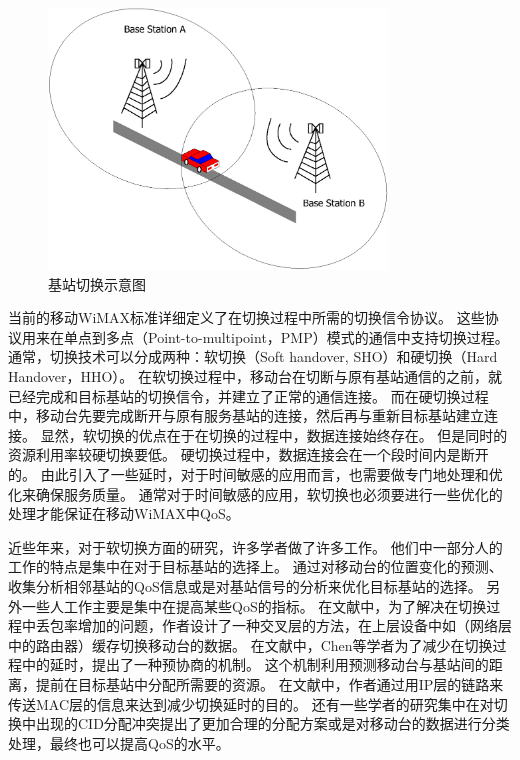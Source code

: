 \begin{figure}[t]
\begin{centering}
\includegraphics[width=9cm]{../figures/iccs_handover_bs}
\caption{基站切换示意图}
\label{fig:chap_iccs_handover_bs}
\end{centering}
\end{figure}

当前的移动WiMAX标准详细定义了在切换过程中所需的切换信令协议。
这些协议用来在单点到多点（Point-to-multipoint，PMP）模式的通信中支持切换过程。
通常，切换技术可以分成两种：软切换（Soft handover, SHO）和硬切换（Hard Handover，HHO）。
在软切换过程中，移动台在切断与原有基站通信的之前，就已经完成和目标基站的切换信令，并建立了正常的通信连接。
而在硬切换过程中，移动台先要完成断开与原有服务基站的连接，然后再与重新目标基站建立连接。
显然，软切换的优点在于在切换的过程中，数据连接始终存在。
但是同时的资源利用率较硬切换要低。
硬切换过程中，数据连接会在一个段时间内是断开的。
由此引入了一些延时，对于时间敏感的应用而言，也需要做专门地处理和优化来确保服务质量。
通常对于时间敏感的应用，软切换也必须要进行一些优化的处理才能保证在移动WiMAX中QoS。


近些年来，对于软切换方面的研究，许多学者做了许多工作。
他们中一部分人的工作的特点是集中在对于目标基站的选择上。
通过对移动台的位置变化的预测、收集分析相邻基站的QoS信息或是对基站信号的分析来优化目标基站的选择\cite{Hsieh:INFOCOM2003}\cite{DooHwan:WPC2006}。
另外一些人工作主要是集中在提高某些QoS的指标。
在文献\cite{MinsikICACT2006}中，为了解决在切换过程中丢包率增加的问题，作者设计了一种交叉层的方法，在上层设备中如（网络层中的路由器）缓存切换移动台的数据。
在文献\cite{JenHui:AUSWIRELESS:2007}中，Chen等学者为了减少在切换过程中的延时，提出了一种预协商的机制。
这个机制利用预测移动台与基站间的距离，提前在目标基站中分配所需要的资源。
在文献\cite{LingVTC2007}中，作者通过用IP层的链路来传送MAC层的信息来达到减少切换延时的目的。
还有一些学者的研究集中在对切换中出现的CID分配冲突提出了更加合理的分配方案或是对移动台的数据进行分类处理，最终也可以提高QoS的水平\cite{Hu:TVT2004}\cite{Wenhua:ICC2007}。


